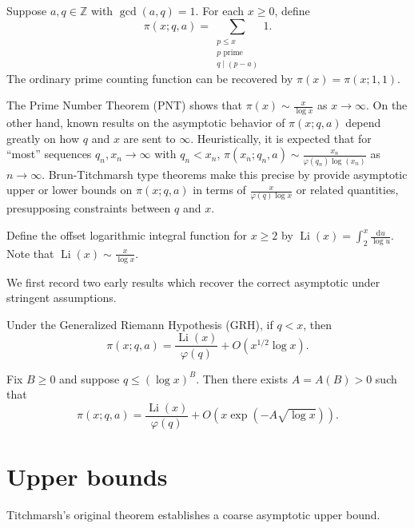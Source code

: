\begin{definition}
Suppose $a,q\in\mathbb Z$ with $\gcd(a,q)=1$. For each $x\geq0$, define
$$\pi(x;q,a)=\sum_{\substack{p\leq x\\p\text{ prime}\\q\mid(p-a)}}1.$$
The ordinary prime counting function can be recovered by $\pi(x)=\pi(x;1,1)$.
\end{definition}

The Prime Number Theorem (PNT) shows that $\pi(x)\sim\frac x{\log x}$ as $x\to\infty$. On the other hand, known results on the asymptotic behavior of $\pi(x;q,a)$ depend greatly on how $q$ and $x$ are sent to $\infty$. Heuristically, it is expected that for ``most'' sequences $q_n,x_n\to\infty$ with $q_n<x_n$, $\pi(x_n;q_n,a)\sim\frac{x_n}{\varphi(q_n)\log(x_n)}$ as $n\to\infty$. Brun-Titchmarsh type theorems make this precise by provide asymptotic upper or lower bounds on $\pi(x;q,a)$ in terms of $\frac x{\varphi(q)\log x}$ or related quantities, presupposing constraints between $q$ and $x$.

\begin{definition}
Define the offset logarithmic integral function for $x\geq2$ by $\operatorname{Li}(x)=\int_2^x\frac{\mathrm du}{\log u}$. Note that $\operatorname{Li}(x)\sim\frac x{\log x}$.
\end{definition}

We first record two early results which recover the correct asymptotic under stringent assumptions.

\begin{theorem}\label{titchmarsh-GRH-asymptotic}
Under the Generalized Riemann Hypothesis (GRH), if $q<x$, then
$$\pi(x;q,a)=\frac{\operatorname{Li}(x)}{\varphi(q)}+O(x^{1/2}\log x).$$
\end{theorem}

\begin{theorem}\label{walfisz-small-q-asymptotic}
Fix $B\geq0$ and suppose $q\leq(\log x)^B$. Then there exists $A=A(B)>0$ such that
$$\pi(x;q,a)=\frac{\operatorname{Li}(x)}{\varphi(q)}+O(x\exp(-A\sqrt{\log x})).$$
\end{theorem}

\section{Upper bounds}
Titchmarsh's original theorem establishes a coarse asymptotic upper bound.

